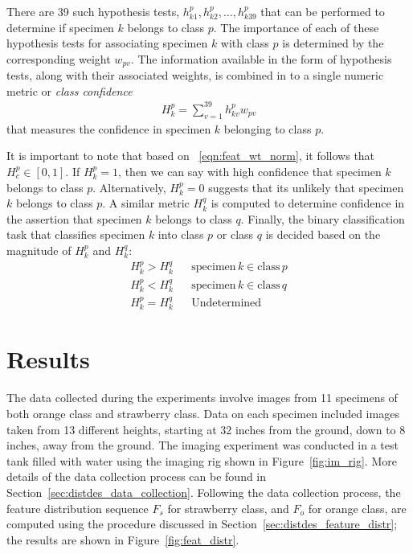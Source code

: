 There are 39 such hypothesis tests, $h^p_{k1}, h^p_{k2},\ldots, h^p_{k39}$ that can be performed to determine if specimen $k$ belongs to class $p$.
The importance of each of these hypothesis tests for associating specimen $k$ with class $p$ is determined by the corresponding weight $w_{pv}$. The information available in the form of hypothesis tests, along with their associated weights, is combined in to a single numeric metric or \emph{class confidence} 
%
\begin{align} \label{eqn:numeric_class_metric}
 H^p_k=\sum_{v=1}^{39} h^p_{kv} w_{pv} 
\end{align}
%
that measures the confidence in specimen $k$ belonging to class $p$.

It is important to note that based on ~\eqref{eqn:feat_wt_norm}, it follows that $H^p_c\in[0,1]$. If $H^p_k=1$, then we can say with high confidence that specimen $k$ belongs to class $p$. Alternatively, $H^p_k=0$ suggests that its unlikely that specimen $k$ belongs to class $p$. A similar metric $H^q_k$ is computed to determine confidence in the assertion that
specimen $k$ belongs to class $q$. Finally, the binary classification task that classifies specimen $k$ into class $p$ or class $q$ is decided based on the magnitude of $H^p_k$ and $H^q_k$:
%
\begin{align}	\label{eqn:binary_classification}
 H^p_k > H^q_k	&{} &\text{specimen}\, k \in \text{class}\, p\nonumber\\
 H^p_k < H^q_k	&{} &\text{specimen}\, k \in \text{class}\, q\nonumber\\
 H^p_k = H^q_k	&{} &\text{Undetermined}
\end{align}


\section{Results}

The data collected during the experiments involve images from 11 specimens of both orange class and strawberry class. Data on each specimen included images taken from 13 different heights, starting at 32 inches from the ground, down to 8 inches, away from the ground. The imaging experiment was conducted in a test tank filled with water using the imaging rig shown in Figure~\ref{fig:im_rig}. More details of the data collection process can be found in Section~\ref{sec:distdes_data_collection}. Following the data collection process, the feature distribution sequence $F_{s}$ for strawberry class, and $F_{o}$  for orange class, are computed using the procedure discussed in Section~\ref{sec:distdes_feature_distr}; the results are shown in Figure~\ref{fig:feat_distr}.

